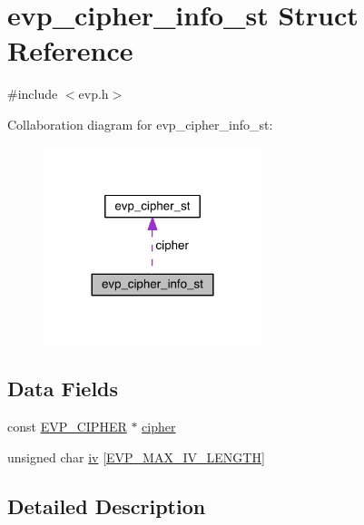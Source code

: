 \hypertarget{structevp__cipher__info__st}{}\section{evp\+\_\+cipher\+\_\+info\+\_\+st Struct Reference}
\label{structevp__cipher__info__st}


{\ttfamily \#include $<$evp.\+h$>$}



Collaboration diagram for evp\+\_\+cipher\+\_\+info\+\_\+st\+:\nopagebreak
\begin{figure}[H]
\begin{center}
\leavevmode
\includegraphics[width=180pt]{structevp__cipher__info__st__coll__graph}
\end{center}
\end{figure}
\subsection*{Data Fields}
\begin{DoxyCompactItemize}
\item 
const \hyperlink{crypto_2ossl__typ_8h_a54a8663a8084d45c31f2786156b55405}{E\+V\+P\+\_\+\+C\+I\+P\+H\+ER} $\ast$ \hyperlink{structevp__cipher__info__st_a535356548694b85372c7d1fb18e05f1d}{cipher}
\item 
unsigned char \hyperlink{structevp__cipher__info__st_a6c9c7c6ccc60886208223861223467ff}{iv} \mbox{[}\hyperlink{include_2openssl_2evp_8h_a80893bc2dbae769441bf6a042cf4069e}{E\+V\+P\+\_\+\+M\+A\+X\+\_\+\+I\+V\+\_\+\+L\+E\+N\+G\+TH}\mbox{]}
\end{DoxyCompactItemize}


\subsection{Detailed Description}


